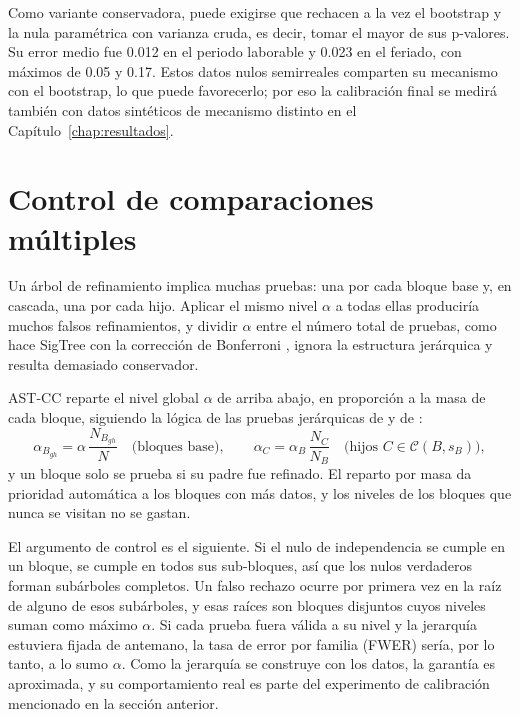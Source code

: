 Como variante conservadora, puede exigirse que rechacen a la vez el bootstrap y
la nula paramétrica con varianza cruda, es decir, tomar el mayor de sus
p-valores. Su error medio fue 0.012 en el periodo laborable y 0.023 en el
feriado, con máximos de 0.05 y 0.17. Estos datos nulos semirreales comparten su
mecanismo con el bootstrap, lo que puede favorecerlo; por eso la calibración
final se medirá también con datos sintéticos de mecanismo distinto en el
Capítulo~\ref{chap:resultados}.

\section{Control de comparaciones múltiples}\label{sec:prop-multiplicidad}

Un árbol de refinamiento implica muchas pruebas: una por cada bloque base y, en
cascada, una por cada hijo. Aplicar el mismo nivel $\alpha$ a todas ellas
produciría muchos falsos refinamientos, y dividir $\alpha$ entre el número total
de pruebas, como hace SigTree con la corrección de Bonferroni \cite{Hu2025},
ignora la estructura jerárquica y resulta demasiado conservador.

AST-CC reparte el nivel global $\alpha$ de arriba abajo, en proporción a la masa
de cada bloque, siguiendo la lógica de las pruebas jerárquicas de
\cite{Meinshausen2008} y de \cite{Kimes2017}:
\begin{equation}\label{eq:prop-alpha}
  \alpha_{B_{gh}} = \alpha\,\frac{N_{B_{gh}}}{N}\quad\text{(bloques base)},
  \qquad
  \alpha_{C} = \alpha_B\,\frac{N_C}{N_B}\quad\text{(hijos } C\in\mathcal{C}(B,s_B)\text{)},
\end{equation}
y un bloque solo se prueba si su padre fue refinado. El reparto por masa da
prioridad automática a los bloques con más datos, y los niveles de los bloques
que nunca se visitan no se gastan.

El argumento de control es el siguiente. Si el nulo de independencia se cumple
en un bloque, se cumple en todos sus sub-bloques, así que los nulos verdaderos
forman subárboles completos. Un falso rechazo ocurre por primera vez en la raíz
de alguno de esos subárboles, y esas raíces son bloques disjuntos cuyos niveles
suman como máximo $\alpha$. Si cada prueba fuera válida a su nivel y la
jerarquía estuviera fijada de antemano, la tasa de error por familia (FWER)
sería, por lo tanto, a lo sumo $\alpha$. Como la jerarquía se construye con los
datos, la garantía es aproximada, y su comportamiento real es parte del
experimento de calibración mencionado en la sección anterior.

